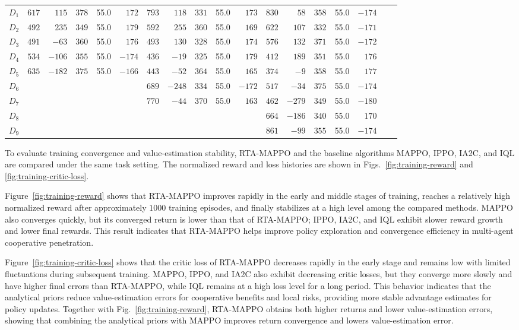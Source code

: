 \documentclass{cja}
\begin{document}
\begin{table}[!t]
{\begin{tabular}{@{}c rrrrr rrrrr rrrrr cc@{}}
$D_1$ & $617$ & $115$ & $378$ & 55.0 & $172$ & $793$ & $118$ & $331$ & 55.0 & $173$ & $830$ & $58$ & $358$ & 55.0 & $-174$ &&\\
$D_2$ & $492$ & $235$ & $349$ & 55.0 & $179$ & $592$ & $255$ & $360$ & 55.0 & $169$ & $622$ & $107$ & $332$ & 55.0 & $-171$ &&\\
$D_3$ & $491$ & $-63$ & $360$ & 55.0 & $176$ & $493$ & $130$ & $328$ & 55.0 & $174$ & $576$ & $132$ & $371$ & 55.0 & $-172$ &&\\
$D_4$ & $534$ & $-106$ & $355$ & 55.0 & $-174$ & $436$ & $-19$ & $325$ & 55.0 & $179$ & $412$ & $189$ & $351$ & 55.0 & $176$ &&\\
$D_5$ & $635$ & $-182$ & $375$ & 55.0 & $-166$ & $443$ & $-52$ & $364$ & 55.0 & $165$ & $374$ & $-9$ & $358$ & 55.0 & $177$ &&\\
$D_6$ & & & & & & $689$ & $-248$ & $334$ & 55.0 & $-172$ & $517$ & $-34$ & $375$ & 55.0 & $-174$ &&\\
$D_7$ & & & & & & $770$ & $-44$ & $370$ & 55.0 & $163$ & $462$ & $-279$ & $349$ & 55.0 & $-180$ &&\\
$D_8$ & & & & & & & & & & & $664$ & $-186$ & $340$ & 55.0 & $170$ &&\\
$D_9$ & & & & & & & & & & & $861$ & $-99$ & $355$ & 55.0 & $-174$ &&\\
\bottomrule
\end{tabular}%
}
\end{table}

To evaluate training convergence and value-estimation stability, RTA-MAPPO and the baseline algorithms MAPPO, IPPO, IA2C, and IQL are compared under the same task setting. The normalized reward and loss histories are shown in Figs.~\ref{fig:training-reward} and \ref{fig:training-critic-loss}.

Figure~\ref{fig:training-reward} shows that RTA-MAPPO improves rapidly in the early and middle stages of training, reaches a relatively high normalized reward after approximately $1000$ training episodes, and finally stabilizes at a high level among the compared methods. MAPPO also converges quickly, but its converged return is lower than that of RTA-MAPPO; IPPO, IA2C, and IQL exhibit slower reward growth and lower final rewards. This result indicates that RTA-MAPPO helps improve policy exploration and convergence efficiency in multi-agent cooperative penetration.

Figure~\ref{fig:training-critic-loss} shows that the critic loss of RTA-MAPPO decreases rapidly in the early stage and remains low with limited fluctuations during subsequent training. MAPPO, IPPO, and IA2C also exhibit decreasing critic losses, but they converge more slowly and have higher final errors than RTA-MAPPO, while IQL remains at a high loss level for a long period. This behavior indicates that the analytical priors reduce value-estimation errors for cooperative benefits and local risks, providing more stable advantage estimates for policy updates. Together with Fig.~\ref{fig:training-reward}, RTA-MAPPO obtains both higher returns and lower value-estimation errors, showing that combining the analytical priors with MAPPO improves return convergence and lowers value-estimation error.
\end{document}
